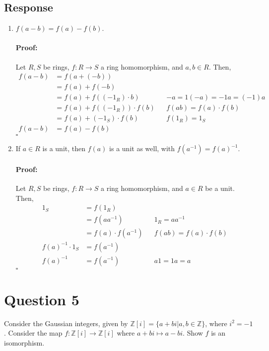 \documentclass [12pt] {article}
\newcommand{\Z}{\mathbb{Z}}
\newenvironment{proof}{\paragraph{Proof:}}{\hfill$\square$}
\begin{document}
\subsection*{Response}
    \begin{enumerate}
        \item $f(a - b) = f(a) - f(b)$. \vspace{-12pt}

            \begin{proof}
                Let $R, S$ be rings, $f : R \to S$ a ring homomorphism, and $a, b \in R$. Then,
                \begin{align*}
                    f(a - b) &= f(a + (-b)) \\
                             &= f(a) + f(-b) \\
                             &= f(a) + f((-1_R) \cdot b) && -a = 1(-a) = -1a = (-1)a \\
                             &= f(a) + f((-1_R)) \cdot f(b) && f(ab) = f(a) \cdot f(b)\\
                             &= f(a) + (-1_S) \cdot f(b) && f(1_R) = 1_S \\
                    f(a - b) &= f(a) - f(b)
                \end{align*}
            \end{proof}        
        \item If $a\in R$ is a unit, then $f(a)$ is a unit as well, with $f(a^{-1})=f(a)^{-1}$. \vspace{-12pt}

            \begin{proof}
                Let $R, S$ be rings, $f : R \to S$ a ring homomorphism, and $a \in R$ be a unit. 
                Then,
                \begin{align*}
                    1_S &= f(1_R) \\
                        &= f(a a^{-1}) && 1_R = a a^{-1} \\
                        &= f(a) \cdot f(a^{-1}) && f(ab) = f(a) \cdot f(b) \\
                    f(a)^{-1} \cdot 1_S &= f(a^{-1}) \\
                    f(a)^{-1} &= f(a^{-1}) && a1 = 1a = a
                \end{align*}
            \end{proof}
    \end{enumerate}
\newpage

\section*{Question 5}
Consider the Gaussian integers, given by $\Z[i]=\{a+bi|a,b\in\Z\}$, where $i^2=-1$. Consider the map $f:\Z[i]\to \Z[i]$ where $a+bi\mapsto a-bi$. Show $f$ is an isomorphism.
\end{document}
